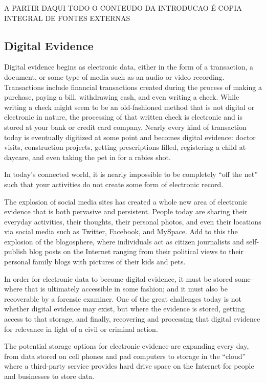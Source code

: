 \begin{center}
A PARTIR DAQUI TODO O CONTEUDO DA INTRODUCAO É COPIA INTEGRAL DE FONTES EXTERNAS
\end{center}


\subsection{Digital Evidence}

Digital evidence begins as electronic data, either in the form of a transaction, a document,
or some type of media such as an audio or video recording. Transactions
include financial transactions created during the process of making a purchase, paying
a bill, withdrawing cash, and even writing a check. While writing a check might
seem to be an old-fashioned method that is not digital or electronic in nature, the
processing of that written check is electronic and is stored at your bank or credit
card company. Nearly every kind of transaction today is eventually digitized at
some point and becomes digital evidence: doctor visits, construction projects,
getting prescriptions filled, registering a child at daycare, and even taking the pet in
for a rabies shot.

In today’s connected world, it is nearly impossible to be completely “off the
net” such that your activities do not create some form of electronic record.

The explosion of social media sites has created a whole new area of electronic
evidence that is both pervasive and persistent. People today are sharing their everyday
activities, their thoughts, their personal photos, and even their locations via
social media such as Twitter, Facebook, and MySpace. Add to this the explosion
of the blogosphere, where individuals act as citizen journalists and self-publish
blog posts on the Internet ranging from their political views to their personal family
blogs with pictures of their kids and pets.

In order for electronic data to become digital evidence, it must be stored some-
where that is ultimately accessible in some fashion; and it must also be recoverable
by a forensic examiner. One of the great challenges today is not whether digital
evidence may exist, but where the evidence is stored, getting access to that storage,
and finally, recovering and processing that digital evidence for relevance in light of
a civil or criminal action.

The potential storage options for electronic evidence are expanding every
day, from data stored on cell phones and pad computers to storage in the “cloud”
where a third-party service provides hard drive space on the Internet for people and
businesses to store data.

